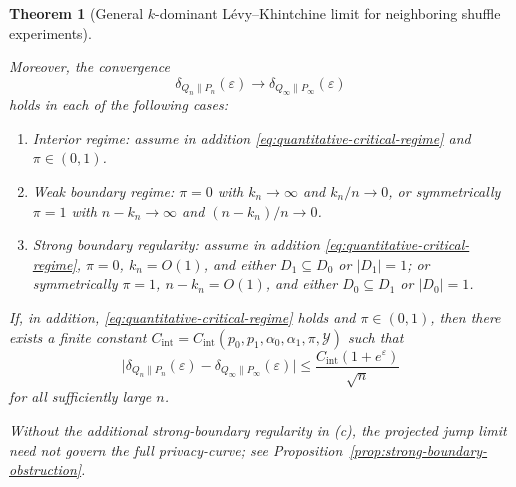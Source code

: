 \documentclass{article}
\newtheorem{theorem}{Theorem}[section]
\newcommand{\1}{\mathbf 1}
\newcommand{\privacycurve}{\mbox{privacy-curve}}
\begin{document}
\begin{theorem}[General $k$-dominant L\'evy--Khintchine limit for neighboring shuffle experiments]
\begin{enumerate}
Moreover, the convergence
\[
\delta_{Q_n\|P_n}(\varepsilon)\longrightarrow \delta_{Q_\infty\|P_\infty}(\varepsilon)
\]
holds in each of the following cases:
\begin{enumerate}
\item[(a)] \emph{Interior regime:} assume in addition \eqref{eq:quantitative-critical-regime} and $\pi\in(0,1)$.
\item[(b)] \emph{Weak boundary regime:} $\pi=0$ with $k_n\to\infty$ and $k_n/n\to 0$, or symmetrically
$\pi=1$ with $n-k_n\to\infty$ and $(n-k_n)/n\to 0$.
\item[(c)] \emph{Strong boundary regularity:} assume in addition \eqref{eq:quantitative-critical-regime},
$\pi=0$, $k_n=O(1)$, and either $D_1\subseteq D_0$ or
$|D_1|=1$; or symmetrically $\pi=1$, $n-k_n=O(1)$, and either $D_0\subseteq D_1$ or $|D_0|=1$.
\end{enumerate}

If, in addition, \eqref{eq:quantitative-critical-regime} holds and $\pi\in(0,1)$, then there exists a finite constant
$C_{\mathrm{int}}=C_{\mathrm{int}}(p_0,p_1,\alpha_0,\alpha_1,\pi,\mathcal Y)$ such that
\[
\bigl|
\delta_{Q_n\|P_n}(\varepsilon)-\delta_{Q_\infty\|P_\infty}(\varepsilon)
\bigr|
\le
\frac{C_{\mathrm{int}}(1+e^\varepsilon)}{\sqrt n}
\]
for all sufficiently large $n$.

Without the additional strong-boundary regularity in \textup{(c)}, the projected jump limit need not govern the
full \privacycurve; see Proposition~\ref{prop:strong-boundary-obstruction}.
\end{enumerate}
\end{theorem}
\end{document}
